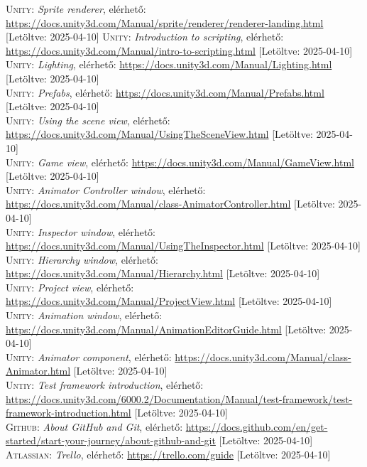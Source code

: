 \documentclass[
]{thesis-ekf}
\theoremstyle{definition}
\theoremstyle{remark}
\begin{document}
\begin{thebibliography}{2}
\textsc{Unity}: \emph{Sprite renderer}, elérhető:
\url{https://docs.unity3d.com/Manual/sprite/renderer/renderer-landing.html} [Letöltve: 2025-04-10]
\textsc{Unity}: \emph{Introduction to scripting}, elérhető:
\url{https://docs.unity3d.com/Manual/intro-to-scripting.html} [Letöltve: 2025-04-10]
\textsc{Unity}: \emph{Lighting}, elérhető:
\url{https://docs.unity3d.com/Manual/Lighting.html} [Letöltve: 2025-04-10]\\
\textsc{Unity}: \emph{Prefabs}, elérhető:
\url{https://docs.unity3d.com/Manual/Prefabs.html} [Letöltve: 2025-04-10]\\
\textsc{Unity}: \emph{Using the scene view}, elérhető:
\url{https://docs.unity3d.com/Manual/UsingTheSceneView.html} [Letöltve: 2025-04-10]\\
\textsc{Unity}: \emph{Game view}, elérhető:
\url{https://docs.unity3d.com/Manual/GameView.html} [Letöltve: 2025-04-10]\\
\textsc{Unity}: \emph{Animator Controller window}, elérhető:
\url{https://docs.unity3d.com/Manual/class-AnimatorController.html} [Letöltve: 2025-04-10]\\
\textsc{Unity}: \emph{Inspector window}, elérhető:
\url{https://docs.unity3d.com/Manual/UsingTheInspector.html} [Letöltve: 2025-04-10]
\textsc{Unity}: \emph{Hierarchy window}, elérhető:
\url{https://docs.unity3d.com/Manual/Hierarchy.html} [Letöltve: 2025-04-10]\\
\textsc{Unity}: \emph{Project view}, elérhető:
\url{https://docs.unity3d.com/Manual/ProjectView.html} [Letöltve: 2025-04-10]\\
\textsc{Unity}: \emph{Animation window}, elérhető:
\url{https://docs.unity3d.com/Manual/AnimationEditorGuide.html} [Letöltve: 2025-04-10]\\
\textsc{Unity}: \emph{Animator component}, elérhető:
\url{https://docs.unity3d.com/Manual/class-Animator.html} [Letöltve: 2025-04-10]\\
\textsc{Untiy}: \emph{Test framework introduction}, elérhető:
\url{https://docs.unity3d.com/6000.2/Documentation/Manual/test-framework/test-framework-introduction.html} [Letöltve: 2025-04-10]\\

\textsc{Github}: \emph{About GitHub and Git}, elérhető:
\url{https://docs.github.com/en/get-started/start-your-journey/about-github-and-git} [Letöltve: 2025-04-10]\\
\textsc{Atlassian}: \emph{Trello}, elérhető:
\url{https://trello.com/guide} [Letöltve: 2025-04-10]\\
\end{thebibliography}


\end{document}
